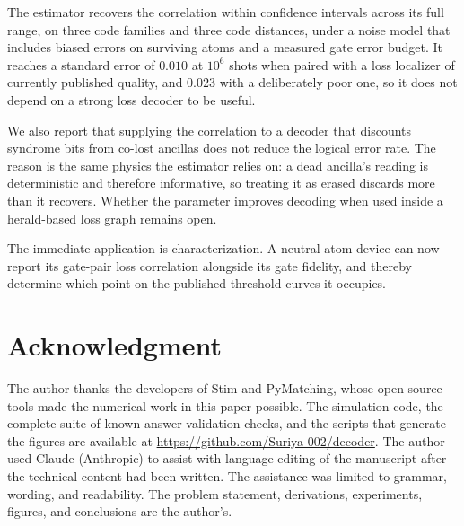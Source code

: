 \documentclass{ieeeaccess}
\begin{document}
The estimator recovers the correlation within confidence intervals across its
full range, on three code families and three code distances, under a noise
model that includes biased errors on surviving atoms and a measured gate error
budget. It reaches a standard error of $0.010$ at $10^{6}$ shots when paired
with a loss localizer of currently published quality, and $0.023$ with a
deliberately poor one, so it does not depend on a strong loss decoder to be
useful.

We also report that supplying the correlation to a decoder that discounts
syndrome bits from co-lost ancillas does not reduce the logical error rate.
The reason is the same physics the estimator relies on: a dead ancilla's
reading is deterministic and therefore informative, so treating it as erased
discards more than it recovers. Whether the parameter improves decoding when
used inside a herald-based loss graph remains open.

The immediate application is characterization. A neutral-atom device can now
report its gate-pair loss correlation alongside its gate fidelity, and thereby
determine which point on the published threshold curves it occupies.



\section*{Acknowledgment}
The author thanks the developers of Stim and PyMatching, whose open-source
tools made the numerical work in this paper possible. The simulation code, the
complete suite of known-answer validation checks, and the scripts that generate
the figures are available at \url{https://github.com/Suriya-002/decoder}.
The author used Claude (Anthropic) to assist with language editing of the
manuscript after the technical content had been written. The assistance was
limited to grammar, wording, and readability. The problem statement,
derivations, experiments, figures, and conclusions are the author's.




\EOD
\end{document}
